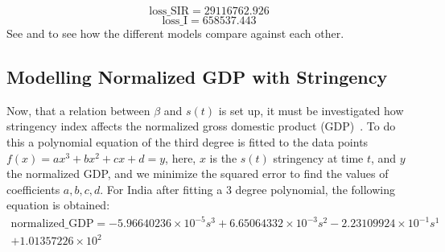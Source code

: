 \documentclass[tikz,fleqn,12pt]{wlscirep}
\begin{document}
\begin{equation}
  \textrm{loss\_SIR} = 29116762.926
  \label{eq:cost_SIR_with_lockdown_and_time_varying_nu}
\end{equation}
\begin{equation}
  \textrm{loss\_I} = 658537.443
  \label{eq:cost_I_with_lockdown_and_time_varying_nu}
\end{equation}
See  and  to see how the different models compare against each other.

\subsection{Modelling Normalized GDP with Stringency}
Now, that a relation between $\beta$ and $s(t)$ is set up, it must be investigated how stringency index affects the normalized gross domestic product (GDP)~\cite{OECDNormalizedGDP,OECDNormalizedGDP2}. To do this a polynomial equation of the third degree is fitted to the data points $f(x) = a x^3 + b x^2 + c x + d = y$, here, $x$ is the $s(t)$ stringency at time $t$, and $y$ the normalized GDP, and we minimize the squared error to find the values of coefficients $a, b, c, d$. For India after fitting a 3 degree polynomial, the following equation is obtained:
\begin{equation}
    \begin{split}
      \textrm{normalized\_GDP} = -5.96640236 \times 10^{-5} s^{3} + 6.65064332 \times 10^{-3} s^{2} - 2.23109924 \times 10^{-1} s^{1} \\
    + 1.01357226 \times 10^{2}
    \end{split}
    \label{eq:gdp_modelled_with_stringency_IND}
\end{equation}
\end{document}
